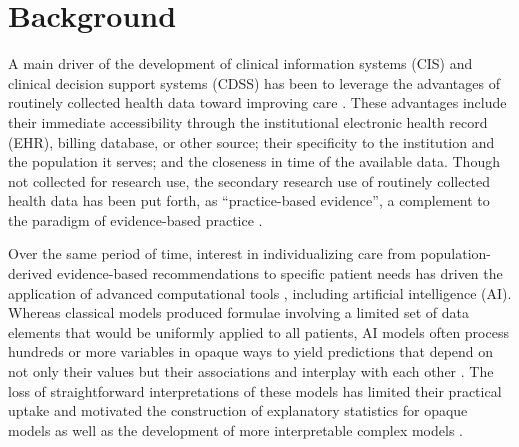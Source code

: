 \documentclass[sn-mathphys,Numbered,pdflatex]{sn-jnl}
\theoremstyle{remark}
\theoremstyle{definition}
\newcommand{\hl}[1]{#1}
\begin{document}

\maketitle

\pagebreak

\section{Background}\label{background}

A main driver of the development of clinical information systems (CIS)
and \hl{clinical decision support systems (CDSS)} has been to leverage
the advantages of routinely collected health data toward
\hl{improving care }\citep{Benchimol2015, Wasylewicz2019}. These
advantages include their immediate accessibility through the
institutional \hl{electronic health record (EHR)}, billing database, or
other source; their specificity to the institution and the population it
serves; and the closeness in time of the available data. \hl{Though not}
collected for research use, the secondary research use of routinely
collected health data has been put forth, as ``practice-based
evidence'', a complement to the paradigm of
\hl{evidence-based practice }\citep{Sim2001, Holmqvist2015}.

Over the same period of time, interest in individualizing care from
population-derived evidence-based recommendations to specific patient
needs has driven the application of
\hl{advanced computational tools }\citep{Rosella2022, Elhaddad2024},
including artificial intelligence (AI). Whereas classical models
produced formulae involving a limited set of data elements that would be
uniformly applied to all patients, AI models often process hundreds or
more variables in opaque ways to yield predictions that depend on not
only their values but
\hl{their associations and interplay with each other }\citep{Molnar2023}.
The loss of straightforward interpretations of these models has limited
their practical uptake and motivated the construction of explanatory
statistics for opaque models as well as the development of
\hl{more interpretable complex models }\citep{Rudin2022, Molnar2023}.
\end{document}
